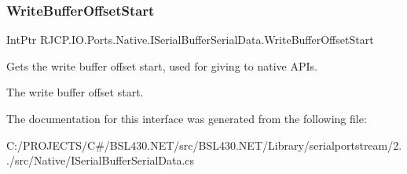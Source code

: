 \subsubsection{\texorpdfstring{WriteBufferOffsetStart}{WriteBufferOffsetStart}}
{\footnotesize\ttfamily Int\+Ptr R\+J\+C\+P.\+I\+O.\+Ports.\+Native.\+I\+Serial\+Buffer\+Serial\+Data.\+Write\+Buffer\+Offset\+Start\hspace{0.3cm}{\ttfamily [get]}}



Gets the write buffer offset start, used for giving to native A\+PI\textquotesingle{}s. 

The write buffer offset start. 

The documentation for this interface was generated from the following file\+:\begin{DoxyCompactItemize}
\item 
C\+:/\+P\+R\+O\+J\+E\+C\+T\+S/\+C\#/\+B\+S\+L430.\+N\+E\+T/src/\+B\+S\+L430.\+N\+E\+T/\+Library/serialportstream/2../src/\+Native/I\+Serial\+Buffer\+Serial\+Data.\+cs\end{DoxyCompactItemize}

